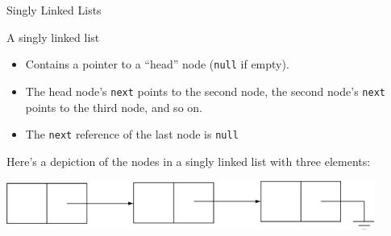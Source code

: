 \documentclass{beamer}
\begin{document}
\begin{frame}[fragile]{Singly Linked Lists}


A singly linked list
\begin{itemize}
\item Contains a pointer to a ``head'' node ({\tt null} if empty).
\item The head node's {\tt next} points to the second node, the second node's {\tt next} points to the third node, and so on.
\item The {\tt next} reference of the last node is {\tt null}
\end{itemize}

Here's a depiction of the nodes in a singly linked list with three elements:
\begin{center}
\includegraphics[width=4.75in]{singly-linked-list.png}
\end{center}


\end{frame}
\end{document}
